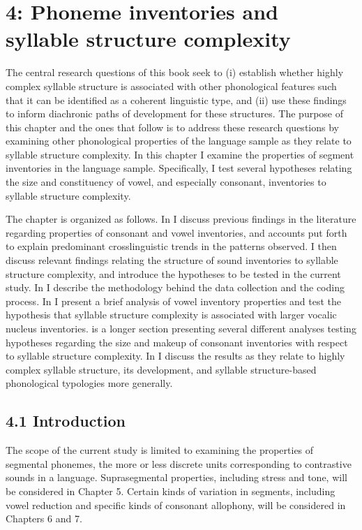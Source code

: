 \chapter{4: Phoneme inventories and syllable structure complexity}

  The central research questions of this book seek to (i) establish whether highly complex syllable structure is associated with other phonological features such that it can be identified as a coherent linguistic type, and (ii) use these findings to inform diachronic paths of development for these structures. The purpose of this chapter and the ones that follow is to address these research questions by examining other phonological properties of the language sample as they relate to syllable structure complexity. In this chapter I examine the properties of segment inventories in the language sample. Specifically, I test several hypotheses relating the size and constituency of vowel, and especially consonant, inventories to syllable structure complexity.



  The chapter is organized as follows. In  I discuss previous findings in the literature regarding properties of consonant and vowel inventories, and accounts put forth to explain predominant crosslinguistic trends in the patterns observed. I then discuss relevant findings relating the structure of sound inventories to syllable structure complexity, and introduce the hypotheses to be tested in the current study. In  I describe the methodology behind the data collection and the coding process. In  I present a brief analysis of vowel inventory properties and test the hypothesis that syllable structure complexity is associated with larger vocalic nucleus inventories.  is a longer section presenting several different analyses testing hypotheses regarding the size and makeup of consonant inventories with respect to syllable structure complexity. In  I discuss the results as they relate to highly complex syllable structure, its development, and syllable structure-based phonological typologies more generally.


\section{4.1 Introduction}

  The scope of the current study is limited to examining the properties of segmental phonemes, the more or less discrete units corresponding to contrastive sounds in a language. Suprasegmental properties, including stress and tone, will be considered in Chapter 5. Certain kinds of variation in segments, including vowel reduction and specific kinds of consonant allophony, will be considered in Chapters 6 and 7.



